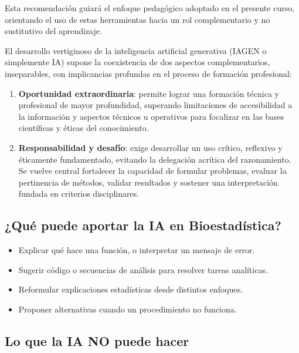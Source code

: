 \documentclass[
  spanish,
  letterpaper,
  DIV=11,
  numbers=noendperiod]{scrreprt}
\providecommand{\tightlist}{%
  \setlength{\itemsep}{0pt}\setlength{\parskip}{0pt}}
\begin{document}
Esta recomendación guiará el enfoque pedagógico adoptado en el presente
curso, orientando el uso de estas herramientas hacia un rol
complementario y no sustitutivo del aprendizaje.

El desarrollo vertiginoso de la inteligencia artificial generativa
(IAGEN o simplemente IA) supone la coexistencia de dos aspectos
complementarios, inseparables, con implicancias profundas en el proceso
de formación profesional:

\begin{enumerate}
\def\labelenumi{\arabic{enumi}.}
\tightlist
\item
  \textbf{Oportunidad extraordinaria}: permite lograr una formación
  técnica y profesional de mayor profundidad, superando limitaciones de
  accesibilidad a la información y aspectos técnicos u operativos para
  focalizar en las bases científicas y éticas del conocimiento.
\item
  \textbf{Responsabilidad y desafío}: exige desarrollar un uso crítico,
  reflexivo y éticamente fundamentado, evitando la delegación acrítica
  del razonamiento. Se vuelve central fortalecer la capacidad de
  formular problemas, evaluar la pertinencia de métodos, validar
  resultados y sostener una interpretación fundada en criterios
  disciplinares.
\end{enumerate}

\subsection{¿Qué puede aportar la IA en
Bioestadística?}\label{quuxe9-puede-aportar-la-ia-en-bioestaduxedstica}

\begin{itemize}
\tightlist
\item
  Explicar qué hace una función, o interpretar un mensaje de error.
\item
  Sugerir código o secuencias de análisis para resolver tareas
  analíticas.
\item
  Reformular explicaciones estadísticas desde distintos enfoques.
\item
  Proponer alternativas cuando un procedimiento no funciona.
\end{itemize}

\subsection{Lo que la IA NO puede
hacer}\label{lo-que-la-ia-no-puede-hacer}
\end{document}
